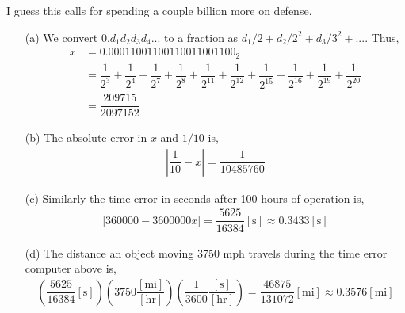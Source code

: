\documentclass[10pt]{article}
\begin{document}
\begin{solution}[Solution]
{\color{red} I guess this calls for spending a couple billion more on defense.}
\begin{enumerate}
    \item[(a)] We convert \( 0.d_1d_2d_3d_4... \) to a fraction as \( d_1/2+d_2/2^2+d_3/3^2+... \). Thus,
        \begin{align*}
            x &= 0.00011001100110011001100_2 \\
            &= \dfrac{1}{2^3}+\dfrac{1}{2^4}+\dfrac{1}{2^7}+\dfrac{1}{2^8}+\dfrac{1}{2^{11}}+\dfrac{1}{2^{12}}+\dfrac{1}{2^{15}}+\dfrac{1}{2^{16}}+\dfrac{1}{2^{19}}+\dfrac{1}{2^{20}} \\
            &=\dfrac{209715}{2097152}
        \end{align*}
    \item[(b)] The absolute error in \( x \) and \( 1/10 \) is, 
        \begin{align*}
            \left|\dfrac{1}{10} - x\right| = \dfrac{1}{10485760}
        \end{align*}
    \item[(c)] Similarly the time error in seconds after 100 hours of operation is,
        \begin{align*}
            \left|360000-3600000x\right| = \dfrac{5625}{16384}[\text{s}] \approx 0.3433[\text{s}]
        \end{align*}
    \item[(d)] The distance an object moving 3750 mph travels during the time error computer above is, 
        \begin{align*}
            \left(\dfrac{5625}{16384}[\text{s}]\right)\left(3750 \dfrac{[\text{mi}]}{[\text{hr}]}\right)\left(\dfrac{1}{3600}\dfrac{[\text{s}]}{[\text{hr}]}\right) = \dfrac{46875}{131072}[\text{mi}] \approx 0.3576[\text{mi}]
        \end{align*}
\end{enumerate}
\end{solution}
\end{document}
